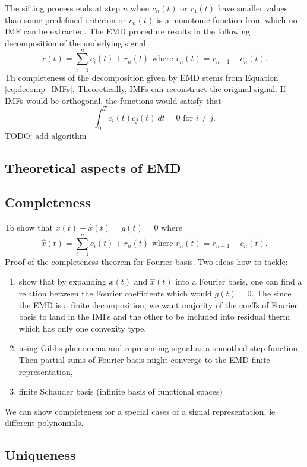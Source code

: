 \documentclass[article,moreauthors,pdftex,10pt,a4paper]{ssrn}
\begin{document}
The sifting process ends at step $n$ when $c_n(t)$ or $r_1(t)$ have smaller values than some predefined criterion or $r_n(t)$ is a monotonic function from which no IMF can be extracted. The EMD procedure results in the following decomposition of the underlying signal
\begin{equation}\label{eq:decomp_IMFs}
x(t) = \sum_{i = 1}^n c_i(t) + r_n(t) \text{ where } r_n(t) = r_{n-1} - c_n(t).
\end{equation}
Th completeness of the decomposition given by EMD stems from Equation \eqref{eq:decomp_IMFs}. Theoretically, IMFs can reconstruct the original signal.  If IMFs would be orthogonal, the functions would satisfy that
\begin{equation}
\int_0^T c_i(t) c_j(t) \ dt =0 \text{ for }i \neq j.
\end{equation}
TODO: add algorithm

\subsection{Theoretical aspects of EMD}

\subsection{Completeness}
To show that $x(t) - \hat{x}(t)  = g(t) =  0 $ where
\begin{equation}
\hat{x}(t) = \sum_{i = 1}^n c_i(t) + r_n(t) \text{ where } r_n(t) = r_{n-1} - c_n(t).
\end{equation}
Proof of the completeness theorem for Fourier basis. 
Two ideas how to tackle:
\begin{enumerate}
\item show that by expanding $x(t)$ and $\hat{x}(t)$ into a Fourier basis, one can find a relation between the Fourier coefficients which would  $g(t) =  0$. The since the EMD is a finite decomposition, we want majority of the coeffs of Fourier basis to land in the IMFs and the other to be included into residual therm which has only one convexity type.
\item using Gibbs phenomena and representing signal as a smoothed step function. Then partial sums of Fourier basis might converge to the EMD finite representation,
\item finite Schauder basis (infinite basis of functional spaces)
\end{enumerate}
We can show completeness for a special cases of a signal representation, ie different polynomials. 
\subsection{Uniqueness}
\end{document}
